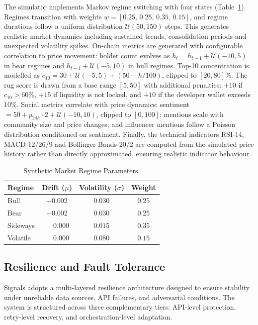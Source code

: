 \documentclass[12pt,a4paper,oneside,openany]{book}
\begin{document}
The simulator implements Markov regime switching with four states (Table~\ref{tab:regimes}). Regimes transition with weights $w = [0.25,\,0.25,\,0.35,\,0.15]$, and regime durations follow a uniform distribution $\mathcal{U}(50, 150)$ steps. This generates realistic market dynamics including sustained trends, consolidation periods and unexpected volatility spikes. On-chain metrics are generated with configurable correlation to price movement: holder count evolves as $h_t = h_{t-1} + \mathcal{U}(-10, 5)$ in bear regimes and $h_{t-1} + \mathcal{U}(-5, 10)$ in bull regimes. Top-10 concentration is modelled as $c_{10} = 30 + \mathcal{U}(-5, 5) + (50 - h/100)$, clipped to $[20, 80]\%$. The rug score is drawn from a base range $[5, 50]$ with additional penalties: $+10$ if $c_{10} > 60\%$, $+15$ if liquidity is not locked, and $+10$ if the developer wallet exceeds 10\%. Social metrics correlate with price dynamics: sentiment $= 50 + p_{24h} \cdot 2 + \mathcal{U}(-10, 10)$, clipped to $[0, 100]$; mentions scale with community size and price changes; and influencer mentions follow a Poisson distribution conditioned on sentiment. Finally, the technical indicators RSI-14, MACD-12/26/9 and Bollinger Bands-20/2 are computed from the simulated price history rather than directly approximated, ensuring realistic indicator behaviour.

\begin{table}[H]
\centering
\caption{Synthetic Market Regime Parameters.}
\label{tab:regimes}
\begin{tabular}{@{}lccc@{}}
\toprule
\textbf{Regime} & \textbf{Drift ($\mu$)} & \textbf{Volatility ($\sigma$)} & \textbf{Weight} \\
\midrule
Bull      & $+0.002$  & $0.030$ & $0.25$ \\
Bear      & $-0.002$  & $0.030$ & $0.25$ \\
Sideways  & $\phantom{+}0.000$   & $0.015$ & $0.35$ \\
Volatile  & $\phantom{+}0.000$   & $0.080$ & $0.15$ \\
\bottomrule
\end{tabular}
\end{table}
\subsection{Resilience and Fault Tolerance}

Signals adopts a multi-layered resilience architecture designed to ensure stability under unreliable data sources, API failures, and adversarial conditions. The system is structured across three complementary tiers: API-level protection, retry-level recovery, and orchestration-level adaptation.
\end{document}
